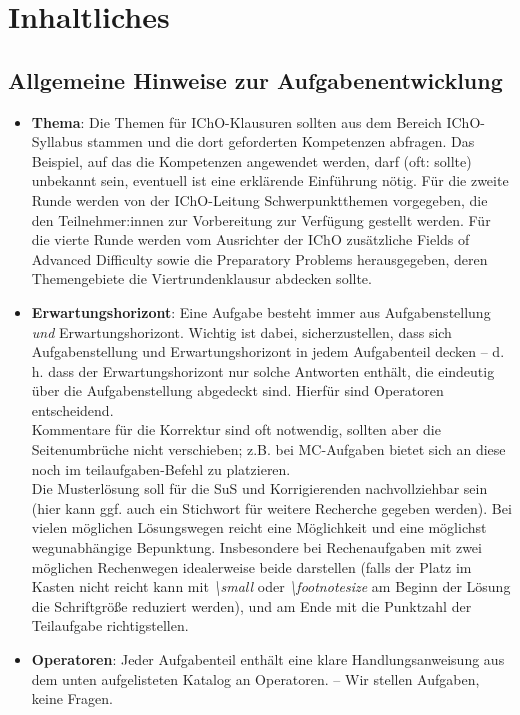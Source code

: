 \documentclass[./main.tex]{subfiles}
\begin{document}
\section{Inhaltliches}
{\subsection{Allgemeine Hinweise zur Aufgabenentwicklung}}
\begin{itemize}
    \item \textbf{Thema}: Die Themen f\"ur IChO-Klausuren sollten aus dem Bereich IChO-Syllabus stammen und die dort geforderten Kompetenzen abfragen. Das Beispiel, auf das die Kompetenzen angewendet werden, darf (oft: sollte) unbekannt sein, eventuell ist eine erkl\"arende Einf\"uhrung n\"otig. F\"ur die zweite Runde werden von der IChO-Leitung Schwerpunktthemen vorgegeben, die den Teilnehmer:innen zur Vorbereitung zur Verf\"ugung gestellt werden. F\"ur die vierte Runde werden vom Ausrichter der IChO zus\"atzliche \glqq{}Fields of Advanced Difficulty\grqq{} sowie die \glqq{}Preparatory Problems\grqq{} herausgegeben, deren Themengebiete die Viertrundenklausur abdecken sollte. 
    \item \textbf{Erwartungshorizont}: Eine Aufgabe besteht immer aus Aufgabenstellung \textit{und} Erwartungshorizont. Wichtig ist dabei, sicherzustellen, dass sich Aufgabenstellung und Erwartungshorizont in jedem Aufgabenteil decken -- d. h. dass der Erwartungshorizont nur solche Antworten enth\"alt, die eindeutig \"uber die Aufgabenstellung abgedeckt sind. Hierf\"ur sind Operatoren entscheidend. \\
    Kommentare f\"ur die Korrektur sind oft notwendig, sollten aber die Seitenumbr\"uche nicht verschieben; z.B. bei MC-Aufgaben bietet sich an diese noch im teilaufgaben-Befehl zu platzieren. \\
    Die Musterl\"osung soll f\"ur die SuS und Korrigierenden nachvollziehbar sein (hier kann ggf. auch ein Stichwort f\"ur weitere Recherche gegeben werden). Bei vielen m\"oglichen L\"osungswegen reicht eine M\"oglichkeit und eine m\"oglichst wegunabh\"angige Bepunktung. Insbesondere bei Rechenaufgaben mit zwei m\"oglichen Rechenwegen idealerweise beide darstellen (falls der Platz im Kasten nicht reicht kann mit \textit{\textbackslash small} oder \textit{\textbackslash footnotesize} am Beginn der L\"osung die Schriftgr\"o\ss{}e reduziert werden), und am Ende mit \punktehalbieren die Punktzahl der Teilaufgabe richtigstellen. 
    \item \textbf{Operatoren}: Jeder Aufgabenteil enth\"alt eine klare Handlungsanweisung aus dem unten aufgelisteten Katalog an Operatoren. -- \glqq{}Wir stellen Aufgaben, keine Fragen.\grqq{}

\end{itemize}
\end{document}
